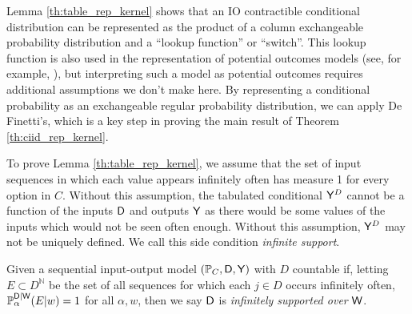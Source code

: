Lemma \ref{th:table_rep_kernel} shows that an IO contractible conditional distribution can be represented as the product of a column exchangeable probability distribution and a ``lookup function'' or ``switch''. This lookup function is also used in the representation of potential outcomes models (see, for example, \citet{rubin_causal_2005}), but interpreting such a model as potential outcomes requires additional assumptions we don't make here. By representing a conditional probability as an exchangeable regular probability distribution, we can apply De Finetti's, which is a key step in proving the main result of Theorem \ref{th:ciid_rep_kernel}.

To prove Lemma \ref{th:table_rep_kernel}, we assume that the set of input sequences in which each value appears infinitely often has measure 1 for every option in $C$. Without this assumption, the tabulated conditional $\mathsf{Y}^D$ cannot be a function of the inputs $\mathsf{D}$ and outputs $\mathsf{Y}$ as there would be some values of the inputs which would not be seen often enough. Without this assumption, $\mathsf{Y}^D$ may not be uniquely defined. We call this side condition \emph{infinite support}.

\begin{definition}
Given a sequential input-output model $(\mathbb{P}_C,\mathsf{D},\mathsf{Y})$ with $D$ countable if, letting $E\subset D^{\mathbb{N}}$ be the set of all sequences for which each $j\in D$ occurs infinitely often, $\mathbb{P}_\alpha^{\mathsf{D}|\mathsf{W}}(E|w)=1$ for all $\alpha,w$, then we say $\mathsf{D}$ is \emph{infinitely supported over }$\mathsf{W}$.
\end{definition}


